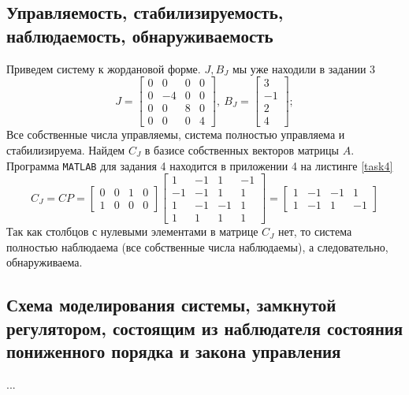 \documentclass[a4paper, 12pt]{article}
\begin{document}
    \subsection{Управляемость, стабилизируемость, наблюдаемость, обнаруживаемость}
    Приведем систему к жордановой форме. $J,B_J$ мы уже находили в задании 3
    $$
    J=\begin{bmatrix}
        0     &0     &0     &0\\
        0    &-4     &0     &0\\
        0     &0     &8     &0\\
        0     &0     &0     &4
        \end{bmatrix},\ B_J=\begin{bmatrix}
            3\\
            -1\\
             2\\
             4
        \end{bmatrix};
    $$
    Все собственные числа управляемы, система полностью управляема и стабилизируема.
    Найдем $C_J$ в базисе собственных векторов матрицы $A$. Программа \texttt{MATLAB}
    для задания 4 находится в приложении 4 на листинге \ref{task4}
    $$
        C_J=CP=\begin{bmatrix}
            0 &0 &1 &0\\
            1 &0 &0 &0
        \end{bmatrix}\begin{bmatrix}
            1    &-1     &1    &-1\\
            -1    &-1     &1     &1\\
             1    &-1    &-1     &1\\
             1     &1     &1     &1
            \end{bmatrix}=\begin{bmatrix}
                1    &-1    &-1     &1\\
     1    &-1     &1    &-1
            \end{bmatrix}
    $$
    Так как столбцов с нулевыми элементами в матрице $C_J$ нет, то система полностью наблюдаема (все собственные числа наблюдаемы),
    а следовательно, обнаруживаема.


    \subsection{Схема моделирования системы, замкнутой регулятором, состоящим из наблюдателя состояния пониженного порядка и закона управления}
    ...
\end{document}
